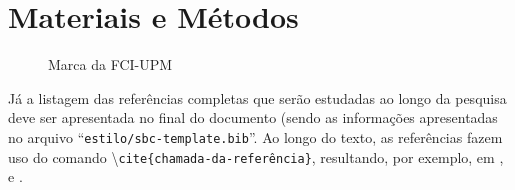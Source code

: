 \section{Materiais e Métodos}
\lipsum[1-1]
\begin{figure}[h]
\centering

\caption{Marca da FCI-UPM}
\end{figure}

Já a listagem das referências completas que serão estudadas ao longo da pesquisa deve ser apresentada no final do documento (sendo as informações apresentadas no arquivo ``\texttt{estilo/sbc-template.bib}''. Ao longo do texto, as referências fazem uso do comando  \textbackslash\texttt{cite\{chamada-da-referência\}}, resultando, por exemplo, em \cite{boulic:91}, \cite{smith:99} e \cite{knuth:84}.
